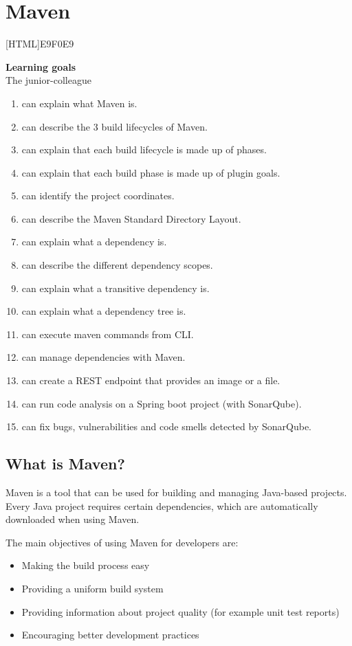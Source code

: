 \chapter{Maven}
\label{chap:maven}

[HTML]{E9F0E9}{\parbox{\textwidth}{%
\noindent \textbf{Learning goals}\\
The junior-colleague
\begin{enumerate}[nolistsep]
\item can explain what Maven is.
\item can describe the 3 build lifecycles of Maven.
\item can explain that each build lifecycle is made up of phases.
\item can explain that each build phase is made up of plugin goals.
\item can identify the project coordinates.
\item can describe the Maven Standard Directory Layout.
\item can explain what a dependency is.
\item can describe the different dependency scopes.
\item can explain what a transitive dependency is.
\item can explain what a dependency tree is.
\item can execute maven commands from CLI.
\item can manage dependencies with Maven.
\item can create a REST endpoint that provides an image or a file.
\item can run code analysis on a Spring boot project (with SonarQube).
\item can fix bugs, vulnerabilities and code smells detected by SonarQube.
\end{enumerate}}}

\section{What is Maven?}

Maven is a tool that can be used for building and managing Java-based projects.
Every Java project requires certain dependencies, which are automatically downloaded when using Maven.

The main objectives of using Maven for developers are:
\begin{itemize}
\item Making the build process easy
\item Providing a uniform build system
\item Providing information about project quality (for example unit test reports)
\item Encouraging better development practices
\end{itemize}

